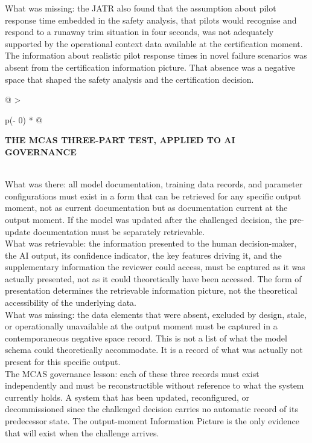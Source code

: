 What was missing: the JATR also found that the assumption about pilot response time embedded in the safety analysis, that pilots would recognise and respond to a runaway trim situation in four seconds, was not adequately supported by the operational context data available at the certification moment. The information about realistic pilot response times in novel failure scenarios was absent from the certification information picture. That absence was a negative space that shaped the safety analysis and the certification decision.

\begin{longtable}[]{@{}
  >{\raggedright\arraybackslash}p{(\columnwidth - 0\tabcolsep) * }@{}}
\toprule\noalign{}
\begin{minipage}[b]{\linewidth}\raggedright
\textbf{THE MCAS THREE-PART TEST, APPLIED TO AI GOVERNANCE}
\end{minipage} \\
\midrule\noalign{}
\endhead
\bottomrule\noalign{}
\endlastfoot
What was there: all model documentation, training data records, and parameter configurations must exist in a form that can be retrieved for any specific output moment, not as current documentation but as documentation current at the output moment. If the model was updated after the challenged decision, the pre-update documentation must be separately retrievable. \\
What was retrievable: the information presented to the human decision-maker, the AI output, its confidence indicator, the key features driving it, and the supplementary information the reviewer could access, must be captured as it was actually presented, not as it could theoretically have been accessed. The form of presentation determines the retrievable information picture, not the theoretical accessibility of the underlying data. \\
What was missing: the data elements that were absent, excluded by design, stale, or operationally unavailable at the output moment must be captured in a contemporaneous negative space record. This is not a list of what the model schema could theoretically accommodate. It is a record of what was actually not present for this specific output. \\
The MCAS governance lesson: each of these three records must exist independently and must be reconstructible without reference to what the system currently holds. A system that has been updated, reconfigured, or decommissioned since the challenged decision carries no automatic record of its predecessor state. The output-moment Information Picture is the only evidence that will exist when the challenge arrives. \\
\end{longtable}

